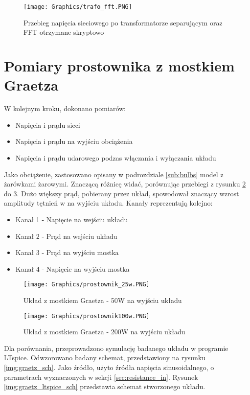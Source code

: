 \begin{figure}[H]
    \centering
    \texttt{[image: Graphics/trafo\_fft.PNG]}
    \caption{Przebieg napięcia sieciowego po transformatorze separującym oraz FFT otrzymane skryptowo}
    \label{img:trafo_fft}
\end{figure}
\section{Pomiary prostownika z mostkiem Graetza}
\label{sec:Graetz}
W kolejnym kroku, dokonano pomiarów:
\begin{itemize}
    \item Napięcia i prądu sieci
    \item Napięcia i prądu na wyjściu obciążenia
    \item Napięcia i prądu udarowego podzas włączania i wyłączania układu
\end{itemize}
Jako obciążenie, zastosowano opisany w podrozdziale \ref{sub:bulbs} model z żarówkami żarowymi.
\newline
Znaczącą różnicę widać, porównując przebiegi z rysunku \ref{img:graetz50w} do \ref{img:graetz200w}. Dużo większy prąd, pobierany przez układ, spowodował znaczący wzrost amplitudy tętnień w na wyjściu układu.
Kanały reprezentują kolejno:
\begin{itemize}
    \item Kanał 1 - Napięcie na wejściu układu
    \item Kanał 2 - Prąd na wejściu układu
    \item Kanał 3 - Prąd na wyjściu mostka
    \item Kanał 4 - Napięcie na wyjściu mostka
\end{itemize}

\begin{figure}[H]
    \centering
    \texttt{[image: Graphics/prostownik\_25w.PNG]}
    \caption{Układ z mostkiem Graetza - 50W na wyjściu układu}
    \label{img:graetz50w}
\end{figure}

\begin{figure}[H]
    \centering
    \texttt{[image: Graphics/prostownik100w.PNG]}
    \caption{Układ z mostkiem Graetza - 200W na wyjściu układu}
    \label{img:graetz200w}
\end{figure}

Dla porównania, przeprowadzono symulację badanego układu w programie LTspice. Odwzorowano badany schemat, przedstawiony na rysunku \ref{img:graetz_sch}. Jako źródło, użyto źródła napięcia sinusoidalnego, o parametrach wyznaczonych w sekcji \ref{sec:resistance_in}. Rysunek \ref{img:graetz_ltspice_sch} przedstawia schemat stworzonego układu.\newline

